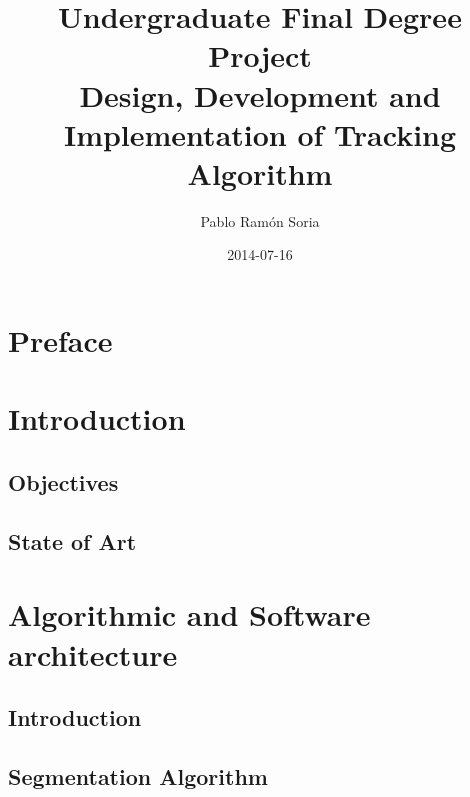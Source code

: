\documentclass[11pt, oneside]{book} %
\begin{document}
\frontmatter
\title{Undergraduate Final Degree Project \\ Design, Development and Implementation of Tracking Algorithm}
\author{Pablo Ram\'on Soria}
\date{2014-07-16}
\maketitle

\tableofcontents

\chapter{Preface}


\chapter{Introduction}
\section{Objectives}


\section{State of Art}

\mainmatter


\chapter{Algorithmic and Software architecture}
\section{Introduction}


\section{Segmentation Algorithm}

\end{document}
